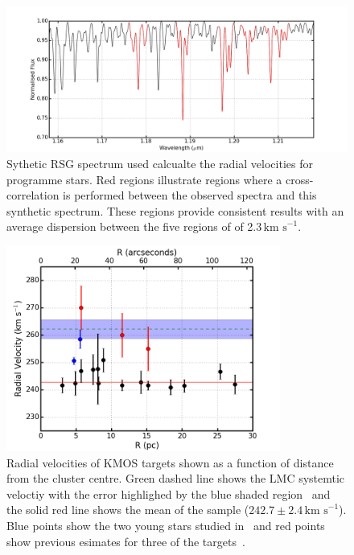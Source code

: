 \documentclass[useAMS,usenatbib]{mn2e}
\def\kms{$\mbox{km s}^{-1}$}
\begin{document}
\begin{figure}
 \includegraphics[width=18.0cm]{NGC2100-rv-regions}
 \caption{Sythetic RSG spectrum used calcualte the radial velocities for programme stars.
 Red regions illustrate regions where a cross-correlation is performed between the observed spectra and this synthetic spectrum.
 These regions provide consistent results with an average dispersion between the five regions of of 2.3\,\kms.
\label{fig:rv-regions}
          }
\end{figure}


\begin{figure}
 \includegraphics[width=9.0cm]{NGC2100-rv-v7}
 \caption{Radial velocities of KMOS targets shown as a function of distance from the cluster centre.
 Green dashed line shows the LMC systemtic veloctiy with the error highlighed by the blue shaded region~\citep[$262.2\pm3.4$\,\kms;][]{2012AJ....144....4M}
 and the solid red line shows the mean of the sample ($242.7\pm2.4\,$\kms).
 Blue points show the two young stars studied in~\cite{2015arXiv150803490E} and red points show previous esimates for three of the targets~\citep{1994A&A...282..717J}.
\label{fig:rvs}
          }
\end{figure}
\end{document}
